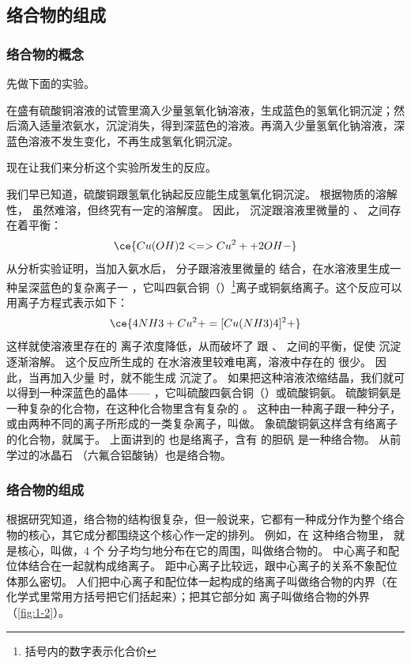 \subsection{络合物的组成}
\subsubsection{络合物的概念}
先做下面的实验。
\begin{Experiment}
在盛有硫酸铜溶液的试管里滴入少量氢氧化钠溶液，生成蓝色的氢氧化铜沉淀；然后滴入适量浓氨水，沉淀消失，得到深蓝色的溶液。再滴入少量氢氧化钠溶液，深蓝色溶液不发生变化，不再生成氢氧化铜沉淀。
\end{Experiment}

现在让我们来分析这个实验所发生的反应。

我们早已知道，硫酸铜跟氢氧化钠起反应能生成氢氧化铜沉淀。
根据物质的溶解性， 虽然难溶，但终究有一定的溶解度。
因此， 沉淀跟溶液里微量的 、 之间存在着平衡：
\[ \ce{ Cu(OH)2 <=> Cu^2+ + 2OH- } \]
从分析实验证明，当加入氨水后， 分子跟溶液里微量的  结合，在水溶液里生成一种呈深蓝色的复杂离子一 ，它叫四氨合铜（）\footnote{括号内的数字表示化合价}离子或铜氨络离子。这个反应可以用离子方程式表示如下：
\[ \ce{4NH3 + Cu^2+ = [Cu(NH3)4]^2+ }\]
这样就使溶液里存在的  离子浓度降低，从而破坏了  跟 、 之间的平衡，促使  沉淀逐渐溶解。
这个反应所生成的  在水溶液里较难电离，溶液中存在的  很少。
因此，当再加入少量  时，就不能生成  沉淀了。
如果把这种溶液浓缩结晶，我们就可以得到一种深蓝色的晶体—— ，它叫硫酸四氨合铜（）或硫酸铜氨。
硫酸铜氨是一种复杂的化合物，在这种化合物里含有复杂的 。
这种由一种离子跟一种分子，或由两种不同的离子所形成的一类复杂离子，叫做。
象硫酸铜氨这样含有络离子的化合物，就属于。
上面讲到的  也是络离子，含有  的胆矾  是一种络合物。
从前学过的冰晶石 （六氟合铝酸钠）也是络合物。

\subsubsection{络合物的组成}
根据研究知道，络合物的结构很复杂，但一般说来，它都有一种成分作为整个络合物的核心，其它成分都围绕这个核心作一定的排列。
例如，在  这种络合物里， 就是核心，叫做，4 个  分子均匀地分布在它的周围，叫做络合物的。
中心离子和配位体结合在一起就构成络离子。
 距中心离子比较远，跟中心离子的关系不象配位体那么密切。
人们把中心离子和配位体一起构成的络离子叫做络合物的内界（在化学式里常用方括号把它们括起来）；把其它部分如  离子叫做络合物的外界（\cref{fig:1-2}）。


